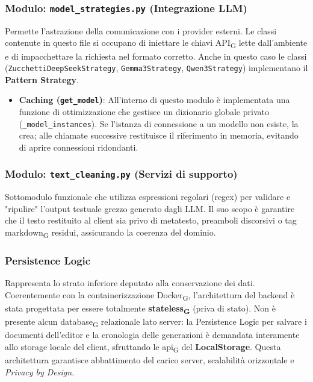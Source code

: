 \documentclass[11pt,a4paper]{article}
\newcommand{\gls}[1]{#1\textsubscript{G}}
\begin{document}
\subsubsection{Modulo: \texttt{model\_strategies.py} (Integrazione LLM)}
Permette l'astrazione della comunicazione con i provider esterni. Le classi contenute in questo file si occupano di iniettare le chiavi \gls{API} lette dall'ambiente e di impacchettare la richiesta nel formato corretto. Anche in questo caso le classi (\texttt{ZucchettiDeepSeekStrategy}, \texttt{Gemma3Strategy}, \texttt{Qwen3Strategy}) implementano il \textbf{Pattern Strategy}.
\begin{itemize}
    \item \textbf{Caching (\texttt{get\_model})}: All'interno di questo modulo è implementata una funzione di ottimizzazione che gestisce un dizionario globale privato (\texttt{\_model\_instances}). Se l'istanza di connessione a un modello non esiste, la crea; alle chiamate successive restituisce il riferimento in memoria, evitando di aprire connessioni ridondanti.
\end{itemize}


\subsubsection{Modulo: \texttt{text\_cleaning.py} (Servizi di supporto)}
Sottomodulo funzionale che utilizza espressioni regolari (regex) per validare e "ripulire" l'output testuale grezzo generato dagli LLM. Il suo scopo è garantire che il testo restituito al client sia privo di metatesto, preamboli discorsivi o tag \gls{markdown} residui, assicurando la coerenza del dominio.

\subsubsection{Persistence Logic}
Rappresenta lo strato inferiore deputato alla conservazione dei dati.  Coerentemente con la containerizzazione \gls{Docker}, l'architettura del backend è stata progettata per essere totalmente \textbf{\gls{stateless}} (priva di stato). Non è presente alcun \gls{database} relazionale lato server: la Persistence Logic per salvare i documenti dell'editor e la cronologia delle generazioni è demandata interamente allo storage locale del client, sfruttando le \gls{api} del \textbf{LocalStorage}. Questa architettura garantisce abbattimento del carico server, scalabilità orizzontale e \textit{Privacy by Design}.
\end{document}
